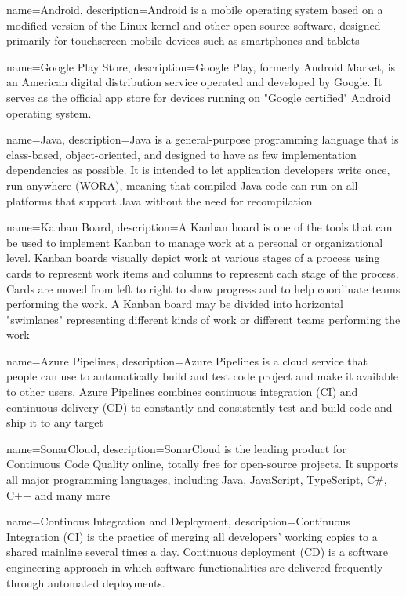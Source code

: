 \usepackage{glossaries}
\makenoidxglossaries

{
    name=Android,
    description={Android is a mobile operating system based on a modified version of the Linux kernel and other open source software, designed primarily for touchscreen mobile devices such as smartphones and tablets}
}

{
    name=Google Play Store,
    description={Google Play, formerly Android Market, is an American digital distribution service operated and developed by Google. It serves as the official app store for devices running on "Google certified" Android operating system.}
}

{
    name=Java,
    description={Java is a general-purpose programming language that is class-based, object-oriented, and designed to have as few implementation dependencies as possible. It is intended to let application developers write once, run anywhere (WORA), meaning that compiled Java code can run on all platforms that support Java without the need for recompilation.}
}

{
    name=Kanban Board,
    description={A Kanban board is one of the tools that can be used to implement Kanban to manage work at a personal or organizational level. Kanban boards visually depict work at various stages of a process using cards to represent work items and columns to represent each stage of the process. Cards are moved from left to right to show progress and to help coordinate teams performing the work. A Kanban board may be divided into horizontal "swimlanes" representing different kinds of work or different teams performing the work}
}

{
    name=Azure Pipelines,
    description={Azure Pipelines is a cloud service that people can use to automatically build and test code project and make it available to other users. Azure Pipelines combines continuous integration (CI) and continuous delivery (CD) to constantly and consistently test and build code and ship it to any target}
}

{
    name=SonarCloud,
    description={SonarCloud is the leading product for Continuous Code Quality online, totally free for open-source projects. It supports all major programming languages, including Java, JavaScript, TypeScript, C\#, C++ and many more}
}

{
    name=Continous Integration and Deployment,
    description={Continuous Integration (CI) is the practice of merging all developers' working copies to a shared mainline several times a day. Continuous deployment (CD) is a software engineering approach in which software functionalities are delivered frequently through automated deployments.}
}

